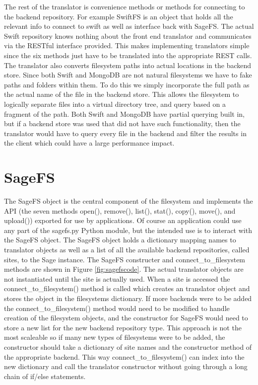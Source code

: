 The rest of the translator is convenience methods or methods for connecting to
the backend repository. For example SwiftFS is an object that holds all the
relevant info to connect to swift as well as interface back with SageFS. The
actual Swift repository knows nothing about the front end translator and
communicates via the RESTful interface provided. This makes implementing translators
simple since the six methods just have to be translated into the appropriate
REST calls. The translator also converts filesystem paths into actual
locations in the backend store. Since both Swift and MongoDB are not natural
filesystems we have to fake paths and folders within them. To do this we
simply incorporate the full path as the actual name of the file in the backend
store. This allows the filesystem to logically separate files into a virtual
directory tree, and query based on a fragment of the path. Both Swift and
MongoDB have partial querying built in, but if a backend store was used that
did not have such functionality, then the translator would have to query every
file in the backend and filter the results in the client which could have a
large performance impact.


\section{SageFS}

The SageFS object is the central component of the filesystem and implements
the API (the seven methods  open(), remove(), list(), stat(), copy(), move(),
and upload()) exported for use by applications. Of course an application could
use any part of the sagefs.py Python module, but the intended use is to
interact with the SageFS object. The SageFS object holds a dictionary mapping
names to translator objects as well as a list of all the available backend
repositories, called sites, to the Sage instance. The SageFS constructer and
connect\_to\_filesystem methods are shown in Figure \ref{fig:sagefscode}. The
actual translator objects are not instantiated until the site is actually
used. When a site is accessed the connect\_to\_filesystem() method is called
which creates an translator object and stores the object in the filesystems
dictionary. If more backends were to be added the connect\_to\_filesystem()
method would need to be modified to handle creation of the filesystem objects,
and the constructor for SageFS would need to store a new list for the new
backend repository type. This approach is not the most scaleable so if many
new types of filesystems were to be added, the constructor should take a
dictionary of site names and the constructor method of the appropriate
backend. This way connect\_to\_filesystem() can index into the new dictionary
and call the translator constructor without going through a long chain of
if/else statements.


